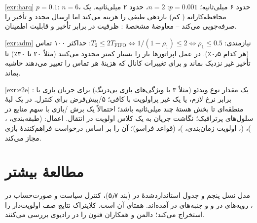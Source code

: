 \documentclass[11pt,a4paper]{article}
\begin{document}
\begin{solutionbox}{\ref{exr:harq}}
$p = 0.1$: $n = 6$، حدود ۶ میلی‌ثانیه؛ $p = 0.001$: $n = 2$، حدود ۲ میلی‌ثانیه. یک  محافظه‌کارانه ( کم) بازدهی طیفی را هزینه
می‌کند اما ارسال مجدد و تأخیر را صرفه‌جویی می‌کند -- معاوضهٔ مشخصهٔ : ظرفیت در برابر تأخیر و قابلیت اطمینان.
\end{solutionbox}

\begin{solutionbox}{\ref{exr:adm}}
نیازمندی: $T_2 \le 2T_{\mathrm{FIFO}} \Leftrightarrow 1/(1-\rho_1) \le 2 \Leftrightarrow \rho_1 \le 0.5$: حداکثر ۱۰۰ تماس (هر کدام ۰٫۵٪). در عمل اپراتورها
بار  را بسیار کمتر محدود می‌کنند (مثلاً ۲۰ تا ۳۰٪) تا تأخیر غیر نزدیک  بماند و برای تغییرات کانال که هزینهٔ هر تماس را
تغییر می‌دهند حاشیه بماند.
\end{solutionbox}

\begin{solutionbox}{\ref{exr:e2e}}
: یک مقدار  نوع ویدئو (مثلاً ۳ با ویژگی‌های بازی بی‌درنگ) برای جریان بازی با  برابر نرخ لازم، یا یک  غیر
پراولویت با  کافی؛  ۵/پیش‌فرض برای کنترل.  در یک لبهٔ منطقه‌ای تا بخش هستهٔ  چند میلی‌ثانیه باشد؛
احتمالاً یک برش /بازی با سهم منابع  در سلول‌های پرترافیک؛ نگاشت جریان به یک کلاس اولویت در انتقال. اعمال: 
(طبقه‌بندی، ، )،  (، اولویت زمان‌بندی، )،  (قواعد فراسو)؛  آن را بر اساس
درخواست  فراهم‌کنندهٔ بازی مجاز می‌کند.
\end{solutionbox}

\section{مطالعهٔ بیشتر}
مدل  نسل پنجم و جدول استانداردشدهٔ  در  \cite{ts23501} (بند ۵٫۷)، کنترل سیاست و صورت‌حساب در 
\cite{ts23503}، رویه‌های  در  \cite{ts23502} و  و جنبه‌های  در  \cite{ts38300} آمده‌اند. همتای
 آن  \cite{ts23203} است. کلاینراک \cite{kleinrock1975queueing} نتایج صف اولویت‌دار را استخراج می‌کند؛ دالمن و همکاران
\cite{dahlman2020nr} فنون  را در رادیوی  بررسی می‌کنند.

\begin{latin}
\printbibliography[heading=subbibliography,title={References}]
\end{latin}
\end{document}
